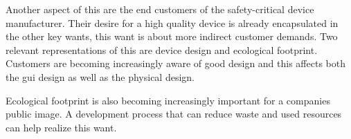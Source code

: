 Another aspect of this are the end customers of the safety-critical device manufacturer. Their desire for a high quality device is already encapsulated in the other key wants, this want is about more indirect customer demands. Two relevant representations of this are device design and ecological footprint. Customers are becoming increasingly aware of good design \cite{HBR.September2015} and this affects both the \acrfull{gui} design as well as the physical design. 

Ecological footprint is also becoming increasingly important for a companies public image. A development process that can reduce waste and used resources can help realize this want.

\begin{comment}
This \textit{want} may seem odd at first [Is saying this unprofessional?] but employees are the ones that are ultimately responsible for the success and failure of the project.

If we take software tools as an example: The software could be difficult to work with or include many repetitive tasks. Repetitive tasks are shown to decrease efficiency and increase the chance for mistakes \cite{Wyatt.1937}. Additionally, depending on the cause for the dissatisfaction it can also be indicative of problems that could them self introduce errors. For example a software tool that is overly complicated. In this instance the employee dissatisfaction is only an indicator for a hidden root cause.

An employee that is unsatisfied with his job, for whatever reason, is also more likely to leave the company. If the person was critical to the project this can have hugely detrimental effects. Furthermore, if enough key people leave, the entire project can be endangered. 
\end{comment}

